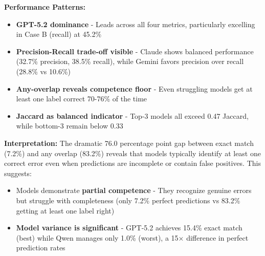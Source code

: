 \documentclass[12pt,a4paper]{article}
\begin{document}
\textbf{Performance Patterns:}
\begin{itemize}[leftmargin=*]
    \item \textbf{GPT-5.2 dominance} - Leads across all four metrics, particularly excelling in Case B (recall) at 45.2\%
    
    \item \textbf{Precision-Recall trade-off visible} - Claude shows balanced performance (32.7\% precision, 38.5\% recall), while Gemini favors precision over recall (28.8\% vs 10.6\%)
    
    \item \textbf{Any-overlap reveals competence floor} - Even struggling models get at least one label correct 70-76\% of the time
    
    \item \textbf{Jaccard as balanced indicator} - Top-3 models all exceed 0.47 Jaccard, while bottom-3 remain below 0.33
\end{itemize}

\textbf{Interpretation:} The dramatic 76.0 percentage point gap between exact match (7.2\%) and any overlap (83.2\%) reveals that models typically identify at least one correct error even when predictions are incomplete or contain false positives. This suggests:

\begin{itemize}[leftmargin=*]
    \item Models demonstrate \textbf{partial competence} - They recognize genuine errors but struggle with completeness (only 7.2\% perfect predictions vs 83.2\% getting at least one label right)
    
    
    
    \item \textbf{Model variance is significant} - GPT-5.2 achieves 15.4\% exact match (best) while Qwen manages only 1.0\% (worst), a 15× difference in perfect prediction rates
\end{itemize}

    
\end{document}
